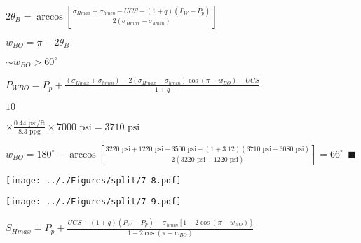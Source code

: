 \documentclass[onecolumn,11pt]{report}
\def\lthtmlcheckvsize{\ifdim\ht\sizebox<\vsize 
  \ifdim\wd\sizebox<\hsize\expandafter\hfill\fi \expandafter\vfill
  \else\expandafter\vss\fi}%
\begin{document}
{\newpage\clearpage
{}%
$\displaystyle 2 \theta_B = \arccos \left[ \frac{ \sigma_{Hmax} + \sigma_{hmin} - UCS - (1+q)(P_W - P_p)}{2(\sigma_{Hmax} - \sigma_{hmin})} \right]$%
\lthtmlindisplaymathZ
\lthtmlcheckvsize\clearpage}

{\newpage\clearpage
{}%
$\displaystyle w_{BO} = \pi - 2 \theta_B$%
\lthtmlindisplaymathZ
\lthtmlcheckvsize\clearpage}

{\newpage\clearpage
{}%
$ \sim w_{BO} > 60^{\circ}$%
\lthtmlindisplaymathZ
\lthtmlcheckvsize\clearpage}

{\newpage\clearpage
{}%
$\displaystyle P_{WBO} = P_p + \frac{ (\sigma_{Hmax} + \sigma_{hmin})
- 2(\sigma_{Hmax} - \sigma_{hmin}) \cos (\pi - w_{BO}) - UCS}{1+q}$%
\lthtmlindisplaymathZ
\lthtmlcheckvsize\clearpage}

{\newpage\clearpage
{}%
$\displaystyle 10$%
\lthtmlindisplaymathZ
\lthtmlcheckvsize\clearpage}

{\newpage\clearpage
{}%
$\displaystyle \times
\frac{0.44 \text{ psi/ft}} {8.3 \text{ ppg}} \times
7000 \text{ psi} = 3710 \text{ psi}
$%
\lthtmlindisplaymathZ
\lthtmlcheckvsize\clearpage}

{\newpage\clearpage
{}%
$\displaystyle w_{BO} = 180^{\circ} - \arccos \left[ \frac{ 3220 \text{ psi} + 1220 \text{ psi} - 3500 \text{ psi} - (1+3.12)(3710 \text{ psi} - 3080 \text{ psi})}{2(3220 \text{ psi} - 1220 \text{ psi})} \right] = 66 ^{\circ} \: \: \blacksquare
$%
\lthtmlindisplaymathZ
\lthtmlcheckvsize\clearpage}

{\newpage\clearpage
{}%
\texttt{[image: .././Figures/split/7-8.pdf]}%
\lthtmlpictureZ
\lthtmlcheckvsize\clearpage}

{\newpage\clearpage
{}%
\texttt{[image: .././Figures/split/7-9.pdf]}%
\lthtmlpictureZ
\lthtmlcheckvsize\clearpage}

{\newpage\clearpage
{}%
$\displaystyle S_{Hmax} = P_p + \frac{UCS + (1+q)(P_W - P_p)
- \sigma_{hmin} \left[ 1 + 2 \cos (\pi - w_{BO}) \right]}
{1 - 2 \cos (\pi - w_{BO})}$%
\lthtmlindisplaymathZ
\lthtmlcheckvsize\clearpage}
\end{document}
